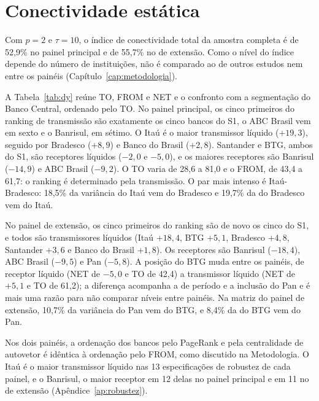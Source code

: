 \section{Conectividade estática}
\label{sec:res-estatica}

Com $p=2$ e $\tau=10$, o índice de conectividade total da amostra completa é
de 52,9\% no painel principal e de 55,7\% no de extensão. Como o nível do
índice depende do número de instituições, não é comparado ao de outros estudos
nem entre os painéis (Capítulo~\ref{cap:metodologia}).

A Tabela~\ref{tab:dy} reúne TO, FROM e NET e o confronto com a segmentação do
Banco Central, ordenado pelo TO. No painel principal, os cinco primeiros do
ranking de transmissão são exatamente os cinco bancos do S1, o ABC Brasil vem em
sexto e o Banrisul, em sétimo. O Itaú é o maior transmissor líquido ($+19{,}3$),
seguido por Bradesco ($+8{,}9$) e Banco do Brasil ($+2{,}8$). Santander e BTG,
ambos do S1, são receptores líquidos ($-2{,}0$ e $-5{,}0$), e os maiores
receptores são Banrisul ($-14{,}9$) e ABC Brasil ($-9{,}2$). O TO varia de 28,6 a
81,0 e o FROM, de 43,4 a 61,7: o ranking é determinado pela transmissão. O par
mais intenso é Itaú-Bradesco: 18,5\% da variância do Itaú vem do Bradesco e
19,7\% da do Bradesco vem do Itaú.

No painel de extensão, os cinco primeiros do ranking são de novo os cinco do S1,
e todos são transmissores líquidos (Itaú $+18{,}4$, BTG $+5{,}1$, Bradesco
$+4{,}8$, Santander $+3{,}6$ e Banco do Brasil $+1{,}8$). Os receptores são
Banrisul ($-18{,}4$), ABC Brasil ($-9{,}5$) e Pan ($-5{,}8$). A posição do BTG
muda entre os painéis, de receptor líquido (NET de $-5{,}0$ e TO de 42,4) a
transmissor líquido (NET de $+5{,}1$ e TO de 61,2); a diferença acompanha a de
período e a inclusão do Pan e é mais uma razão para não comparar níveis entre
painéis. Na matriz do painel de extensão, 10,7\% da variância do Pan vem do BTG,
e 8,4\% da do BTG vem do Pan.

Nos dois painéis, a ordenação dos bancos pelo PageRank e pela centralidade de
autovetor é idêntica à ordenação pelo FROM, como discutido na Metodologia. O
Itaú é o maior transmissor líquido nas 13 especificações de robustez de cada
painel, e o Banrisul, o maior receptor em 12 delas no painel principal e em 11
no de extensão (Apêndice~\ref{ap:robustez}).

